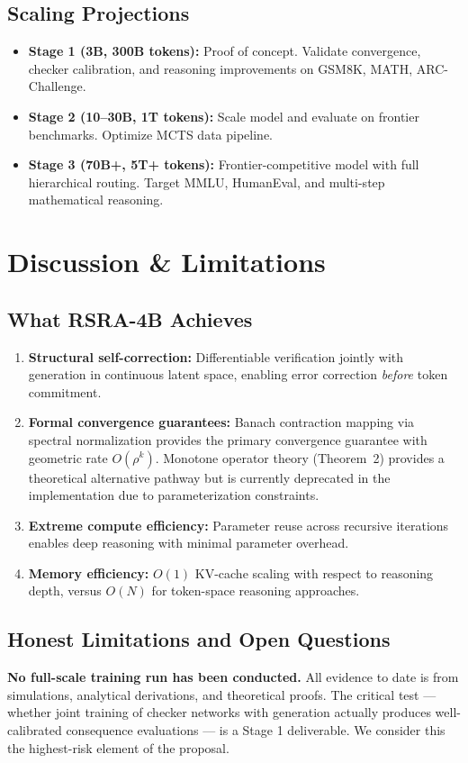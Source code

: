 \documentclass[11pt,a4paper]{article}
\theoremstyle{definition}
\begin{document}
\subsection{Scaling Projections}
\begin{itemize}
    \item \textbf{Stage 1 (3B, 300B tokens):} Proof of concept. Validate convergence, checker calibration, and reasoning improvements on GSM8K, MATH, ARC-Challenge.
    \item \textbf{Stage 2 (10--30B, 1T tokens):} Scale model and evaluate on frontier benchmarks. Optimize MCTS data pipeline.
    \item \textbf{Stage 3 (70B+, 5T+ tokens):} Frontier-competitive model with full hierarchical routing. Target MMLU, HumanEval, and multi-step mathematical reasoning.
\end{itemize}

\section{Discussion \& Limitations}

\subsection{What RSRA-4B Achieves}
\begin{enumerate}
    \item \textbf{Structural self-correction:} Differentiable verification jointly with generation in continuous latent space, enabling error correction \textit{before} token commitment.
    \item \textbf{Formal convergence guarantees:} Banach contraction mapping via spectral normalization provides the primary convergence guarantee with geometric rate $O(\rho^k)$. Monotone operator theory (Theorem~2) provides a theoretical alternative pathway but is currently deprecated in the implementation due to parameterization constraints.
    \item \textbf{Extreme compute efficiency:} Parameter reuse across recursive iterations enables deep reasoning with minimal parameter overhead.
    \item \textbf{Memory efficiency:} $O(1)$ KV-cache scaling with respect to reasoning depth, versus $O(N)$ for token-space reasoning approaches.
\end{enumerate}

\subsection{Honest Limitations and Open Questions}
\textbf{No full-scale training run has been conducted.} All evidence to date is from simulations, analytical derivations, and theoretical proofs. The critical test --- whether joint training of checker networks with generation actually produces well-calibrated consequence evaluations --- is a Stage 1 deliverable. We consider this the highest-risk element of the proposal.
\end{document}
